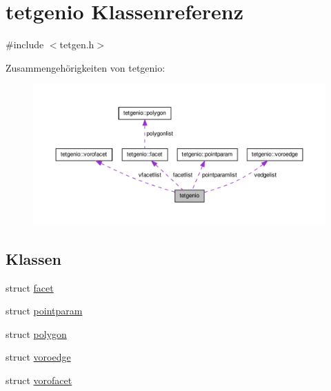 \hypertarget{classtetgenio}{\section{tetgenio Klassenreferenz}
\label{classtetgenio}
}


{\ttfamily \#include $<$tetgen.\-h$>$}



Zusammengehörigkeiten von tetgenio\-:
\nopagebreak
\begin{figure}[H]
\begin{center}
\leavevmode
\includegraphics[width=350pt]{classtetgenio__coll__graph}
\end{center}
\end{figure}
\subsection*{Klassen}
\begin{DoxyCompactItemize}
\item 
struct \hyperlink{structtetgenio_1_1facet}{facet}
\item 
struct \hyperlink{structtetgenio_1_1pointparam}{pointparam}
\item 
struct \hyperlink{structtetgenio_1_1polygon}{polygon}
\item 
struct \hyperlink{structtetgenio_1_1voroedge}{voroedge}
\item 
struct \hyperlink{structtetgenio_1_1vorofacet}{vorofacet}
\end{DoxyCompactItemize}
